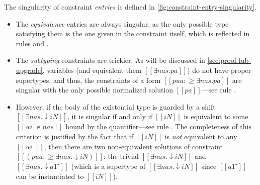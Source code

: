 The singularity of constraint \emph{entries} is defined in
\cref{fig:constraint-entry-singularity}. 
\begin{itemize}
  \item The \emph{equivalence} entries are
    always singular, as the only possible type satisfying them is the one given in
    the constraint itself, which is reflected in rules  and
    . 
  \item The \emph{subtyping} constraints are trickier.
    As will be discussed in \cref{sec:proof-lub-upgrade}, variables (and equivalent
    them $[[∃nas.pa]]$) do not have proper supertypes, and thus, the
    constraints of a form $[[pua :≥ ∃nas.pa]]$ are singular with the only possible
    normalized solution $[[pa]]$---see rule . 
  \item However, if the body of the existential type is guarded by a shift
    $[[∃nas.↓iN]]$, it is singular if and only if $[[iN]]$ is equivalent to some
    $[[αi⁻ ∊ {nas}]]$ bound by the quantifier---see rule
    . The completeness of this criterion is
    justified by the fact that if $[[iN]]$ is \emph{not} equivalent to any
    $[[αi⁻]]$, then there are two non-equivalent solutions of constraint $[[(pua :≥
    ∃nas.↓iN)]]$: the trivial $[[∃nas.↓iN]]$ and $[[∃nas.↓a1⁻]]$ (which is a
    supertype of $[[∃nas.↓iN]]$ since $[[a1⁻]]$ can be instantiated to
    $[[iN]]$).

\end{itemize}

